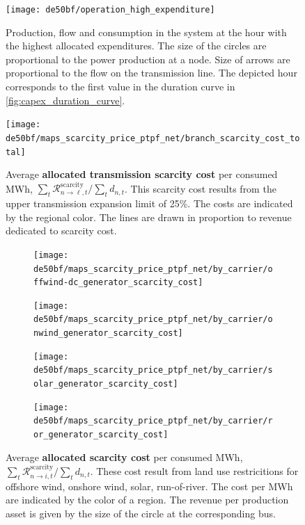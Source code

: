 \documentclass[11pt,twocolumn]{article}
\newcommand{\demand}[1][n]{d_{#1,t}}
\newcommand{\remainingcost}{\mathcal{R}}
\newcommand{\scarcitycost}{\remainingcost^\text{scarcity}}
\newcommand{\allocatescarcitycost}[1][n \rightarrow i]{\scarcitycost_{#1,t}}
\begin{document}
\begin{figure}
    \texttt{[image: de50bf/operation\_high\_expenditure]}
    \caption{Production, flow and consumption in the system at the hour with the highest allocated expenditures. The size of the circles are proportional to the power production at a node. Size of arrows are proportional to the flow on the transmission line. The depicted hour corresponds to the first value in the duration curve in \cref{fig:capex_duration_curve}.}
    \label{fig:operation_high_expenditure}
\end{figure}


\begin{figure}
    \texttt{[image: de50bf/maps\_scarcity\_price\_ptpf\_net/branch\_scarcity\_cost\_total]}
    \caption{Average \textbf{allocated transmission scarcity cost} per consumed MWh, $\sum_t \scarcitycost_{n \rightarrow \ell, t} / \sum_t \demand $. This scarcity cost results from the upper transmission expansion limit of 25\%. The costs are indicated by the regional color.  The lines are drawn in proportion to revenue dedicated to scarcity cost. }
    \label{fig:branch_scarcity_price}
\end{figure}




\begin{figure}
    \centering
    \begin{subfigure}[c]{.49\linewidth}
        \texttt{[image: de50bf/maps\_scarcity\_price\_ptpf\_net/by\_carrier/offwind-dc\_generator\_scarcity\_cost]}
        \label{fig:offwind-dc_generator_scarcity_cost}
    \end{subfigure}
    \begin{subfigure}[c]{.49\linewidth}
        \texttt{[image: de50bf/maps\_scarcity\_price\_ptpf\_net/by\_carrier/onwind\_generator\_scarcity\_cost]}
        \label{fig:onwind_generator_scarcity_cost}
    \end{subfigure}
    \begin{subfigure}[c]{.49\linewidth}
        \texttt{[image: de50bf/maps\_scarcity\_price\_ptpf\_net/by\_carrier/solar\_generator\_scarcity\_cost]}
        \label{fig:solar_generator_scarcity_cost}
    \end{subfigure}
    \begin{subfigure}[c]{.49\linewidth}
        \texttt{[image: de50bf/maps\_scarcity\_price\_ptpf\_net/by\_carrier/ror\_generator\_scarcity\_cost]}
        \label{fig:ror_generator_scarcity_cost}
    \end{subfigure}
    \caption{Average \textbf{allocated scarcity cost} per consumed MWh, $\sum_t \allocatescarcitycost / \sum_t \demand$. These cost result from land use restricitions for offshore wind, onshore wind,  solar, run-of-river. The cost per MWh are indicated by the color of a region. The revenue per production asset is given by the size of the circle at the corresponding bus.}
    \label{fig:scarcity_price}
\end{figure}





\clearpage
\printbibliography
\end{document}
